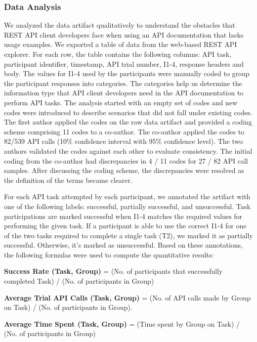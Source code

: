 \documentclass[conference]{IEEEtran}
\begin{document}
\subsubsection{Data Analysis}
We analyzed the data artifact qualitatively to understand the obstacles that REST API client developers face when using an API documentation that lacks usage examples. We exported a table of data from the web-based REST API explorer. For each row, the table contains the following columns: API task, participant identifier, timestamp, API trial number, I1-4, response headers and body. The values for I1-4 used by the participants were manually coded to group the participant responses into categories. The categories help us determine the information type that API client developers need in the API documentation to perform API tasks. The analysis started with an empty set of codes and new codes were introduced to describe scenarios that did not fall under existing codes. The first author applied the codes on the raw data artifact and provided a coding scheme comprising 11 codes to a co-author. The co-author applied the codes to 82/539 API calls (10\% confidence interval with 95\% confidence level). The two authors validated the codes against each other to evaluate consistency. The initial coding from the co-author had discrepancies in 4 / 11 codes for 27 / 82 API call samples. After discussing the coding scheme, the discrepancies were resolved as the definition of the terms became clearer.

For each API task attempted by each participant, we annotated the artifact with one of the following labels: successful, partially successful, and unsuccessful. Task participations are marked successful when I1-4 matches the required values for performing the given task. If a participant is able to use the correct I1-4 for one of the two tasks required to complete a single task (T2), we marked it as partially successful. Otherwise, it's marked as unsuccessful. Based on these annotations, the following formulas were used to compute the quantitative results:



\textbf{Success Rate (Task, Group)} = (No. of participants that successfully completed Task) / (No. of participants in Group)

\textbf{Average Trial API Calls (Task, Group)} = (No. of API calls made by Group on Task) / (No. of participants in Group).

\textbf{Average Time Spent (Task, Group)} = (Time spent by Group on Task) / (No. of participants in Group)
\end{document}
